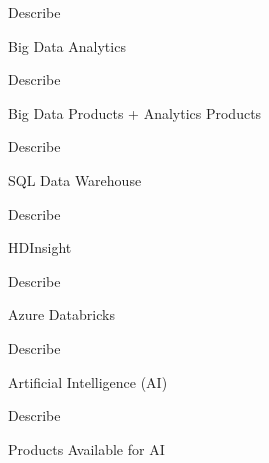 \documentclass{scrartcl}
\newenvironment{flashcard}[2][]{%
    #1
    \vfill
    \centerline{\Large{#2}}
    \vfill
    \newpage
}
{\newpage}
\begin{document}
    \begin{flashcard}[Describe]{Big Data Analytics}

    \end{flashcard}

    \begin{flashcard}[Describe]{Big Data Products + Analytics Products}

    \end{flashcard}

    \begin{flashcard}[Describe]{SQL Data Warehouse}

    \end{flashcard}

    \begin{flashcard}[Describe]{HDInsight}

    \end{flashcard}

    \begin{flashcard}[Describe]{Azure Databricks}

    \end{flashcard}

    \begin{flashcard}[Describe]{Artificial Intelligence (AI)}

    \end{flashcard}

    \begin{flashcard}[Describe]{Products Available for AI}

    \end{flashcard}
\end{document}
